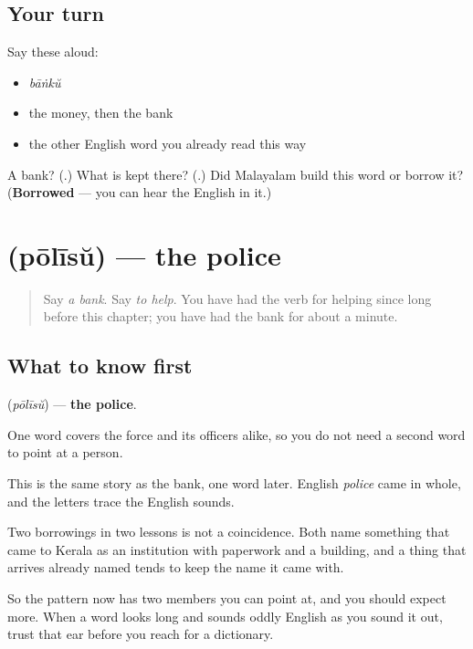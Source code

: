 \subsection*{Your turn}
Say these aloud:

\begin{itemize}
\raggedright
  \item \emph{bāṅkŭ}
  \item the money, then the bank
  \item the other English word you already read this way
\end{itemize}

\begin{tcolorbox}[breakable,colback=teal!4,colframe=teal!35!black,title={Before you move on}]
A bank? (\textbf{}.) What is kept there? (\textbf{}.) Did Malayalam build this word or borrow it? (\textbf{Borrowed} — you can hear the English in it.)
\end{tcolorbox}
\section[\texorpdfstring{\ml{പോലീസ്} (pōlīsŭ)}{പോലീസ് (pōlīsŭ)}]{ (pōlīsŭ) — the police}

\label{lesson:ML-C112-poleesu}



\begin{quote}
Say \emph{a bank}. Say \emph{to help}. You have had the verb for helping since long before this chapter; you have had the bank for about a minute.
\end{quote}

\subsection*{What to know first}
\textbf{} (\emph{pōlīsŭ}) — \textbf{the police}.

One word covers the force and its officers alike, so you do not need a second word to point at a person.

\begin{culture}
This is the same story as the bank, one word later. English \emph{police} came in whole, and the letters trace the English sounds.

Two borrowings in two lessons is not a coincidence. Both name something that came to Kerala as an institution with paperwork and a building, and a thing that arrives already named tends to keep the name it came with.

So the pattern now has two members you can point at, and you should expect more. When a word looks long and sounds oddly English as you sound it out, trust that ear before you reach for a dictionary.
\end{culture}

